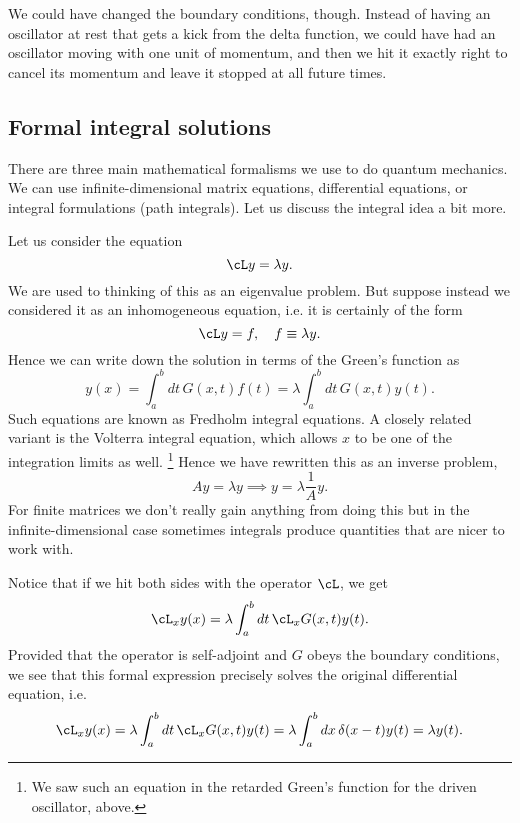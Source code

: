 We could have changed the boundary conditions, though. Instead of having an oscillator at rest that gets a kick from the delta function, we could have had an oscillator moving with one unit of momentum, and then we hit it exactly right to cancel its momentum and leave it stopped at all future times.

\subsection*{Formal integral solutions}
There are three main mathematical formalisms we use to do quantum mechanics. We can use infinite-dimensional matrix equations, differential equations, or integral formulations (path integrals). Let us discuss the integral idea a bit more.%

Let us consider the equation
\begin{equation}
    \cL y = \lambda y.
\end{equation}
We are used to thinking of this as an eigenvalue problem. But suppose instead we considered it as an inhomogeneous equation, i.e. it is certainly of the form
\begin{equation}
    \cL y = f,\quad f\equiv \lambda y.
\end{equation}
Hence we can write down the solution in terms of the Green's function as
\begin{equation}
    y(x) =\int_a^b dt\, G(x,t) f(t) = \lambda \int_a^b dt\, G(x,t) y(t).
\end{equation}
Such equations are known as Fredholm integral equations. A closely related variant is the Volterra integral equation, which allows $x$ to be one of the integration limits as well.%
    \footnote{We saw such an equation in the retarded Green's function for the driven oscillator, above.}
Hence we have rewritten this as an inverse problem,
\begin{equation}
    Ay = \lambda y \implies y = \lambda \frac{1}{A} y.
\end{equation}
For finite matrices we don't really gain anything from doing this but in the infinite-dimensional case sometimes integrals produce quantities that are nicer to work with.

Notice that if we hit both sides with the operator $\cL$, we get
\begin{equation}
    \cL_x y(x)= \lambda \int_a^b dt\, \cL_x G(x,t) y(t).
\end{equation}
Provided that the operator is self-adjoint and $G$ obeys the boundary conditions, we see that this formal expression precisely solves the original differential equation, i.e.
\begin{equation}
    \cL_x y(x) = \lambda \int_a^b dt\, \cL_x G(x,t) y(t) = \lambda \int_a^b dx\,\delta(x-t) y(t) = \lambda y(t).
\end{equation}

